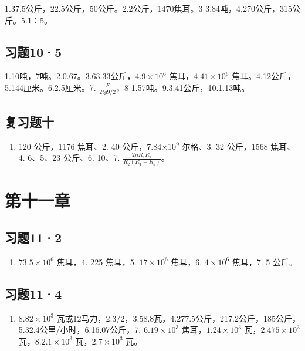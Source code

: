 1.37.5公斤，22.5公斤，50公斤。2.2公斤，1470焦耳。3
3.84吨，4.270公斤，315公斤。5.1：5。

\subsection{习题10·5}\label{ux4e60ux9898105-1}

1.10吨，7吨。2.0.67。3.63.33公斤，\(4.9 \times 10^{6}\)
焦耳，\(4.41 \times 10^{6}\) 焦耳。4.12公斤，5.144厘米。6.2.5厘米。7.
\(\frac{F}{2tg9/2}\)，8 1.57吨。9.3.41公斤，10.1.13吨。

\subsection{复习题十}\label{ux590dux4e60ux9898ux5341-1}

\begin{enumerate}
\def\labelenumi{\arabic{enumi}.}
\tightlist
\item
  120 公斤，1176 焦耳、2. 40 公斤，7.84×10\(^{9}\) 尔格、3. 32
  公斤，1568 焦耳、4. 6、5、23 公斤、6. 10、7.
  \(\frac{2nR_{1}R_{4}}{R_{2}(R_{4}-R_{5})}\)。
\end{enumerate}

\section{第十一章}\label{ux7b2cux5341ux4e00ux7ae0}

\subsection{习题11·2}\label{ux4e60ux9898112-1}

\begin{enumerate}
\def\labelenumi{\arabic{enumi}.}
\setcounter{enumi}{2}
\tightlist
\item
  \(73.5 \times 10^{6}\) 焦耳，4. 225 焦耳，5. \(17 \times 10^{6}\)
  焦耳，6. \(4 \times 10^{6}\) 焦耳，7. 5 公斤。
\end{enumerate}

\subsection{习题11·4}\label{ux4e60ux9898114-1}

\begin{enumerate}
\def\labelenumi{\arabic{enumi}.}
\tightlist
\item
  \(8.82 \times 10^{3}\)
  瓦或12马力，2.3/2，3.58.8瓦，4.277.5公斤，217.2公斤，185公斤，5.32.4公里/小时，6.16.07公斤，7.
  \(6.19 \times 10^{3}\) 焦耳，\(1.24 \times 10^{3}\)
  瓦，\(2.475 \times 10^{3}\) 瓦，\(8.2.1 \times 10^{3}\)
  瓦，\(2.7 \times 10^{3}\) 瓦。
\end{enumerate}

